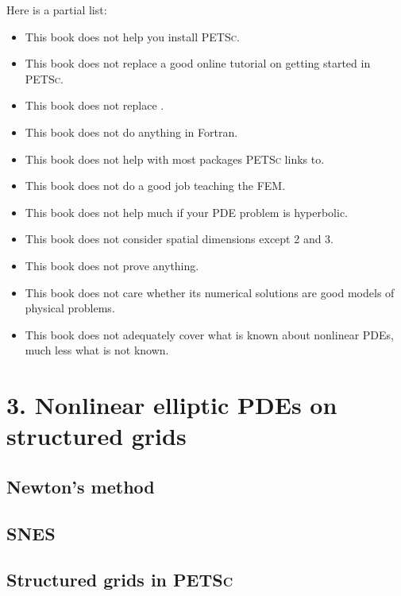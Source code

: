 \documentclass{tufte-book}
\theoremstyle{definition}
\newcommand{\cinputraw}[7]{
\newcommand*\FancyVerbStartString{#5}
\newcommand*\FancyVerbStopString{#6}
\begin{figure*}
\vspace{0.8cm}
\VerbatimInput[frame=single,%
               framesep=3mm,%
               label=\fbox{\normalsize \textsl{\,#2\,}#4},%
               fontfamily=courier,%
               fontsize=\small]{#1}
\vspace{0.5cm}
\caption{#3}
\label{#7}
\end{figure*}
\let\FancyVerbStartString\relax
\let\FancyVerbStopString\relax
}
\newcommand{\cinput}[5]{%
    \cinputraw{cstrip/#1}{#1}{#2}{}{#3}{#4}{#5}}
\newcommand{\PETSc}{\textsc{PETSc}\xspace}
\begin{document}
Here is a partial list:\begin{itemize}
\item This book does not help you install \PETSc.
\item This book does not replace a good online tutorial on getting started in \PETSc.
\item This book does not replace \citep{Smithetal1996}.
\item This book does not do anything in Fortran.
\item This book does not help with most packages \PETSc links to.
\item This book does not do a good job teaching the FEM.
\item This book does not help much if your PDE problem is hyperbolic.
\item This book does not consider spatial dimensions except 2 and 3.
\item This book does not prove anything.
\item This book does not care whether its numerical solutions are good models of physical problems.
\item This book does not adequately cover what is known about nonlinear PDEs, much less what is not known.
\end{itemize}


\mainmatter






\chapter{3. Nonlinear elliptic PDEs on structured grids}

\section{Newton's method}

\section{\textsc{SNES}}


\section{Structured grids in \PETSc}
\end{document}
